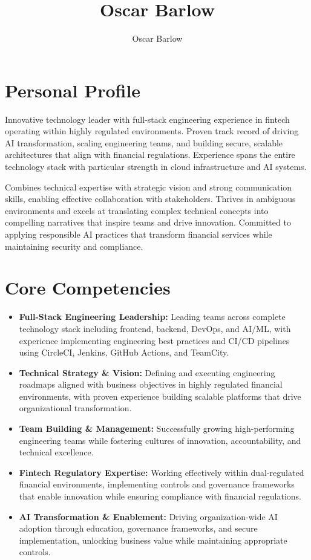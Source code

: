 \documentclass[a4paper]{scrartcl}
\author{Oscar Barlow}
\title{Oscar Barlow}
\date{}
\begin{document}
\maketitle

\section*{Personal Profile}
 {
  \setlength{\parskip}{6pt plus 2pt minus 1pt}
  Innovative technology leader with full-stack engineering experience in fintech operating within highly regulated environments. Proven track record of driving AI transformation, scaling engineering teams, and building secure, scalable architectures that align with financial regulations. Experience spans the entire technology stack with particular strength in cloud infrastructure and AI systems.
  
  Combines technical expertise with strategic vision and strong communication skills, enabling effective collaboration with stakeholders. Thrives in ambiguous environments and excels at translating complex technical concepts into compelling narratives that inspire teams and drive innovation. Committed to applying responsible AI practices that transform financial services while maintaining security and compliance.
 }

\section*{Core Competencies}
\begin{itemize}
	\item \textbf{Full-Stack Engineering Leadership:} Leading teams across complete technology stack including frontend, backend, DevOps, and AI/ML, with experience implementing engineering best practices and CI/CD pipelines using CircleCI, Jenkins, GitHub Actions, and TeamCity.
	\item \textbf{Technical Strategy \& Vision:} Defining and executing engineering roadmaps aligned with business objectives in highly regulated financial environments, with proven experience building scalable platforms that drive organizational transformation.
	\item \textbf{Team Building \& Management:} Successfully growing high-performing engineering teams while fostering cultures of innovation, accountability, and technical excellence.
	\item \textbf{Fintech Regulatory Expertise:} Working effectively within dual-regulated financial environments, implementing controls and governance frameworks that enable innovation while ensuring compliance with financial regulations.
	\item \textbf{AI Transformation \& Enablement:} Driving organization-wide AI adoption through education, governance frameworks, and secure implementation, unlocking business value while maintaining appropriate controls.
\end{itemize}
\end{document}
